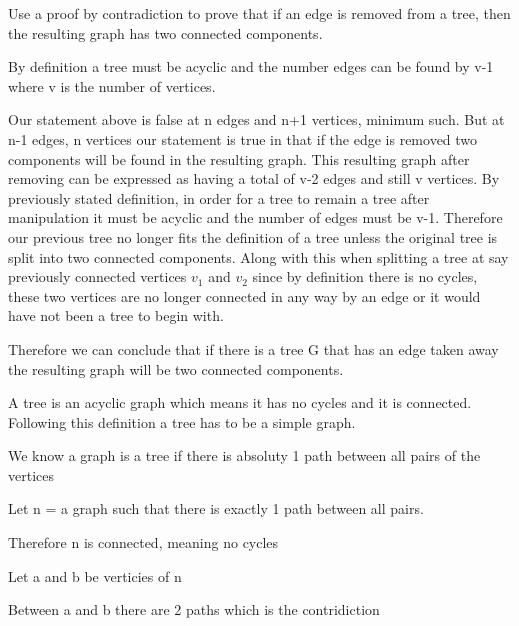 \documentclass{article}
\begin{document}
Use a proof by contradiction to prove that if an edge is removed from a
tree, then the resulting graph has two connected components.

By definition a tree must be acyclic and the number edges can be found by v-1
where v is the number of vertices.

Our statement above is false at n edges and n+1 vertices, minimum such. But at
n-1 edges, n vertices our statement is true in that if the edge is removed two components will
be found in the resulting graph. This resulting graph after removing can be
expressed as having a total of v-2 edges and still v vertices. By previously
stated definition, in order for a tree to remain a tree after manipulation it must
be acyclic and the number of edges must be v-1. Therefore our previous tree no
longer fits the definition of a tree unless the original tree is split into two
connected components. Along with this when splitting a tree at say previously
connected vertices $v_1$ and $v_2$ since by definition there is no cycles, these
two vertices are no longer connected in any way by an edge or it would have not
been a tree to begin with.

Therefore we can conclude that if there is a tree G that has an edge taken away
the resulting graph will be two connected components.

{A tree is an acyclic graph which means it has no cycles and it is connected. Following this definition a tree has to be a simple graph.}

{We know a graph is a tree if there is absoluty 1 path between all pairs of the vertices}

{Let n = a graph such that there is exactly 1 path between all pairs.}

{Therefore n is connected, meaning no cycles}


{Let a and b be verticies of n}

{Between a and b there are 2 paths which is the contridiction}
\end{document}
